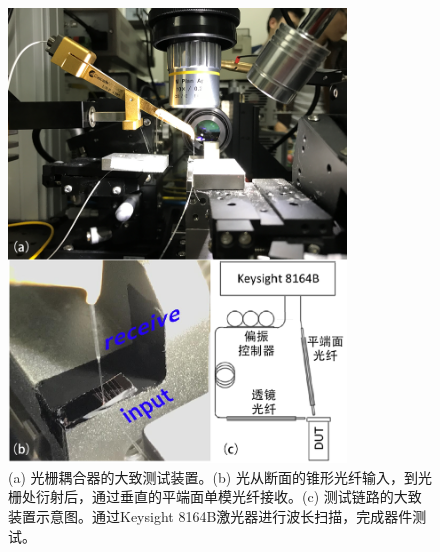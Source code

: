 \begin{figure}[!htbp]
    \centering
    \includegraphics[width=0.8\textwidth]{Img/3-17.png}
    \caption{ (a) 光栅耦合器的大致测试装置。(b) 光从断面的锥形光纤输入，到光栅处衍射后，通过垂直的平端面单模光纤接收。(c) 测试链路的大致装置示意图。通过Keysight 8164B激光器进行波长扫描，完成器件测试。}
    \label{fig:3-17}
\end{figure}

